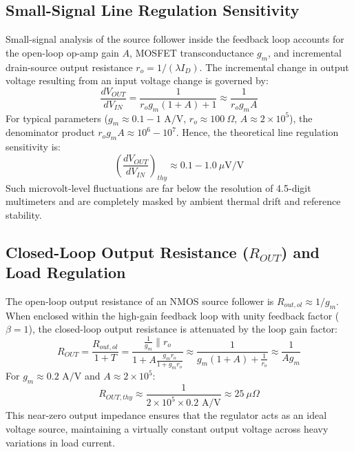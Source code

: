 \documentclass[11pt,a4paper]{article}
\begin{document}
\subsection{Small-Signal Line Regulation Sensitivity}
Small-signal analysis of the source follower inside the feedback loop accounts for the open-loop op-amp gain $A$, MOSFET transconductance $g_m$, and incremental drain-source output resistance $r_o = 1/(\lambda I_D)$. The incremental change in output voltage resulting from an input voltage change is governed by:
\begin{equation}
    \frac{dV_{OUT}}{dV_{IN}} = \frac{1}{r_o g_m (1 + A) + 1} \approx \frac{1}{r_o g_m A}
\end{equation}
For typical parameters ($g_m \approx 0.1 - 1\text{ A/V}$, $r_o \approx 100\ \Omega$, $A \approx 2 \times 10^5$), the denominator product $r_o g_m A \approx 10^6 - 10^7$. Hence, the theoretical line regulation sensitivity is:
\begin{equation}
    \left(\frac{dV_{OUT}}{dV_{IN}}\right)_{thy} \approx 0.1 - 1.0\ \mu\text{V/V}
\end{equation}
Such microvolt-level fluctuations are far below the resolution of 4.5-digit multimeters and are completely masked by ambient thermal drift and reference stability.

\subsection{Closed-Loop Output Resistance (\texorpdfstring{$R_{OUT}$}{R\_OUT}) and Load Regulation}
The open-loop output resistance of an NMOS source follower is $R_{out,ol} \approx 1/g_m$. When enclosed within the high-gain feedback loop with unity feedback factor ($\beta = 1$), the closed-loop output resistance is attenuated by the loop gain factor:
\begin{equation}
    R_{OUT} = \frac{R_{out,ol}}{1 + T} = \frac{\frac{1}{g_m} \parallel r_o}{1 + A \frac{g_m r_o}{1 + g_m r_o}} \approx \frac{1}{g_m(1 + A) + \frac{1}{r_o}} \approx \frac{1}{A g_m}
\end{equation}
For $g_m \approx 0.2\text{ A/V}$ and $A \approx 2 \times 10^5$:
\begin{equation}
    R_{OUT,thy} \approx \frac{1}{2 \times 10^5 \times 0.2\text{ A/V}} \approx 25\ \mu\Omega
\end{equation}
This near-zero output impedance ensures that the regulator acts as an ideal voltage source, maintaining a virtually constant output voltage across heavy variations in load current.
\end{document}
